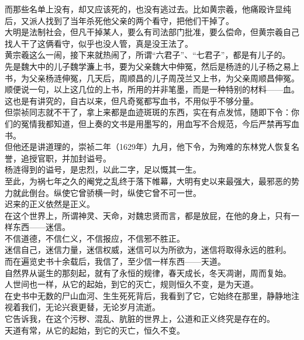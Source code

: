 \begin{multicols}{\theparacolNo}
而那些名单上没有，却又应该死的，也没有逃过去。比如黄宗羲，他痛殴许显纯后，又派人找到了当年杀死他父亲的两个看守，把他们干掉了。\\

大明是法制社会，但凡干掉某人，要么有司法部门批准，要么偿命，但黄宗羲自己找人干了这俩看守，似乎也没人管，真是没王法了。\\

黄宗羲这么一闹，接下来就热闹了，所谓“六君子”、“七君子”，都是有儿子的。\\

先是魏大中的儿子魏学濂上书，要为父亲魏大中伸冤，然后是杨涟的儿子杨之易上书，为父亲杨涟伸冤，几天后，周顺昌的儿子周茂兰又上书，为父亲周顺昌伸冤。\\

顺便说一句，以上这几位的上书，所用的并非笔墨，而是一种特别的材料——血。\\

这也是有讲究的，自古以来，但凡奇冤都写血书，不用似乎不够分量。\\

但崇祯同志就不干了，拿上来都是血迹斑斑的东西，实在有点发怵，随即下令：你们的冤情我都知道，但上奏的文书是用墨写的，用血写不合规范，今后严禁再写血书。\\

但他还是讲道理的，崇祯二年（1629年）九月，他下令，为殉难的东林党人恢复名誉，追授官职，并加封谥号。\\

杨涟得到的谥号，是忠烈，以此二字，足以慨其一生。\\

至此，为祸七年之久的阉党之乱终于落下帷幕，大明有史以来最强大，最邪恶的势力就此倒台。纵使它曾骄横一时，纵使它曾不可一世。\\

迟来的正义依然是正义。\\

在这个世界上，所谓神灵、天命，对魏忠贤而言，都是放屁，在他的身上，只有一样东西——迷信。\\

不信道德，不信仁义，不信报应，不信邪不胜正。\\

迷信自己，迷信力量，迷信权威，迷信可以为所欲为，迷信将取得永远的胜利。\\

而在遍览史书十余载后，我信了，至少信一样东西——天道。\\

自然界从诞生的那刻起，就有了永恒的规律，春天成长，冬天凋谢，周而复始。\\

人世间也一样，从它的起始，到它的灭亡，规则恒久不变，是为天道。\\

在史书中无数的尸山血河、生生死死背后，我看到了它，它始终在那里，静静地注视着我们，无论兴衰更替，无论岁月流逝。\\

它告诉我，在这个污秽、混乱、肮脏的世界上，公道和正义终究是存在的。\\

天道有常，从它的起始，到它的灭亡，恒久不变。\\
\ifnum{}
	\end{multicols}
\fi
\newpage
